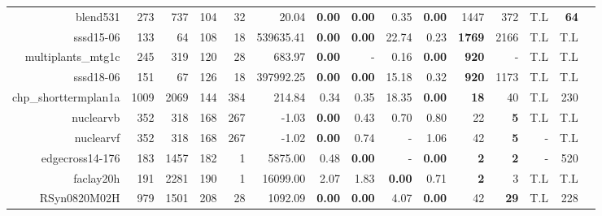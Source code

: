 \begin{table*}[t]
\begin{tabular}{|r|r|r|r|r||r||r|r|r|r||r|r|r|r|r|}
                         blend531 &          273 &          737 &         104 &          32 &             20.04 & \textbf{0.00} &\textbf{0.00} &          0.35 & \textbf{0.00} &         1447 &                372 &          T.L &  \textbf{64} \\ 
                        sssd15-06 &          133 &           64 &         108 &          18 &         539635.41 & \textbf{0.00} &\textbf{0.00} &         22.74 &          0.23 &\textbf{1769} &               2166 &          T.L &          T.L \\ 
               multiplants\_mtg1c &          245 &          319 &         120 &          28 &            683.97 & \textbf{0.00} &            - &          0.16 & \textbf{0.00} & \textbf{920} &                  - &          T.L &          T.L \\ 
                        sssd18-06 &          151 &           67 &         126 &          18 &         397992.25 & \textbf{0.00} &\textbf{0.00} &         15.18 &          0.32 & \textbf{920} &               1173 &          T.L &          T.L \\ 
             chp\_shorttermplan1a &         1009 &         2069 &         144 &         384 &            214.84 &          0.34 &         0.35 &         18.35 & \textbf{0.00} &  \textbf{18} &                 40 &          T.L &          230 \\ 
                        nuclearvb &          352 &          318 &         168 &         267 &             -1.03 & \textbf{0.00} &         0.43 &          0.70 &          0.80 &           22 &         \textbf{5} &          T.L &          T.L \\ 
                        nuclearvf &          352 &          318 &         168 &         267 &             -1.02 & \textbf{0.00} &         0.74 &             - &          1.06 &           42 &         \textbf{5} &            - &          T.L \\ 
                  edgecross14-176 &          183 &         1457 &         182 &           1 &           5875.00 &          0.48 &\textbf{0.00} &             - & \textbf{0.00} &   \textbf{2} &         \textbf{2} &            - &          520 \\ 
                        faclay20h &          191 &         2281 &         190 &           1 &          16099.00 &          2.07 &         1.83 & \textbf{0.00} &          0.71 &   \textbf{2} &                  3 &          T.L &          T.L \\ 
                     RSyn0820M02H &          979 &         1501 &         208 &          28 &           1092.09 & \textbf{0.00} &\textbf{0.00} &          4.07 & \textbf{0.00} &           42 &        \textbf{29} &          T.L &          228 \\ 

\end{tabular}
\end{table*}
